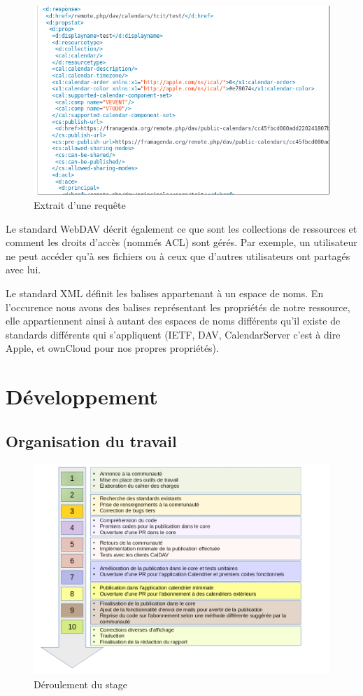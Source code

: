 \documentclass[10pt,a4paper]{report}
\begin{document}
	\begin{figure}[ht]
		\centering
		\includegraphics[width=1\textwidth]{images/requete-xml.png}
		\caption*{Extrait d'une requête}
		\label{normal_case}
	\end{figure}
	
	Le standard WebDAV décrit également ce que sont les collections de ressources et comment les droits d'accès (nommés ACL) sont gérés. Par exemple, un utilisateur ne peut accéder qu'à ses fichiers ou à ceux que d'autres utilisateurs ont partagés avec lui.
	
	Le standard XML définit les balises appartenant à un espace de noms. En l'occurence nous avons des balises représentant les propriétés de notre ressource, elle appartiennent ainsi à autant des espaces de noms différents qu'il existe de standards différents qui s'appliquent (IETF, DAV, CalendarServer c'est à dire Apple, et ownCloud pour nos propres propriétés).
	
	\chapter{Développement}
	\section{Organisation du travail}
	\begin{figure}[ht]
		\centering
		\centerline{\includegraphics[width=1.45\textwidth]{images/deroulement.png}}
		\caption*{Déroulement du stage}
		\label{normal_case}
	\end{figure}
	
\end{document}
